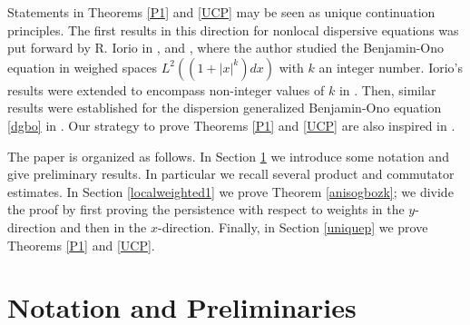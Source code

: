 \documentclass[reqno]{amsart}
\numberwithin{equation}{section}
\begin{document}
Statements in Theorems \ref{P1} and \ref{UCP} may be seen as unique continuation principles. The first results in this direction for nonlocal dispersive equations was put forward by R. Iorio in \cite{Iorio}, \cite{Iorio1} and \cite{Iorio2}, where  the author studied the Benjamin-Ono equation in weighed spaces $L^2((1+|x|^{k})dx)$ with $k$ an integer number. Iorio's results were extended to encompass non-integer values of $k$ in  \cite{GermanPonce}. Then, similar results were established for the dispersion generalized Benjamin-Ono equation \eqref{dgbo} in \cite{FLP1}. Our strategy to prove Theorems \ref{P1} and \ref{UCP} are also inspired in \cite{FLP1}.

The paper is organized as follows. In Section \ref{notation} we introduce some notation and give preliminary results. In particular we recall several product and commutator estimates. In Section \ref{localweighted1} we prove Theorem \ref{anisogbozk}; we divide the proof by first proving the persistence with respect to weights in the $y$-direction and then in the $x$-direction. Finally, in Section \ref{uniquep} we prove Theorems \ref{P1} and \ref{UCP}.




\section{Notation and Preliminaries}\label{notation}
\end{document}
